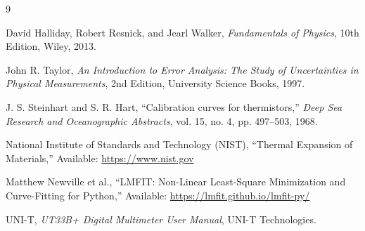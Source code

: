 \documentclass[11pt,a4paper]{article}
\begin{document}
\begin{thebibliography}{9}

David Halliday, Robert Resnick, and Jearl Walker,
\textit{Fundamentals of Physics},
10th Edition,
Wiley, 2013.

John R. Taylor,
\textit{An Introduction to Error Analysis: The Study of Uncertainties in Physical Measurements},
2nd Edition,
University Science Books, 1997.

J. S. Steinhart and S. R. Hart,
“Calibration curves for thermistors,”
\textit{Deep Sea Research and Oceanographic Abstracts},
vol. 15, no. 4, pp. 497--503, 1968.

National Institute of Standards and Technology (NIST),
“Thermal Expansion of Materials,”
Available: \url{https://www.nist.gov}

Matthew Newville et al.,
“LMFIT: Non-Linear Least-Square Minimization and Curve-Fitting for Python,”
Available: \url{https://lmfit.github.io/lmfit-py/}

UNI-T,
\textit{UT33B+ Digital Multimeter User Manual},
UNI-T Technologies.

\end{thebibliography}
\end{document}
